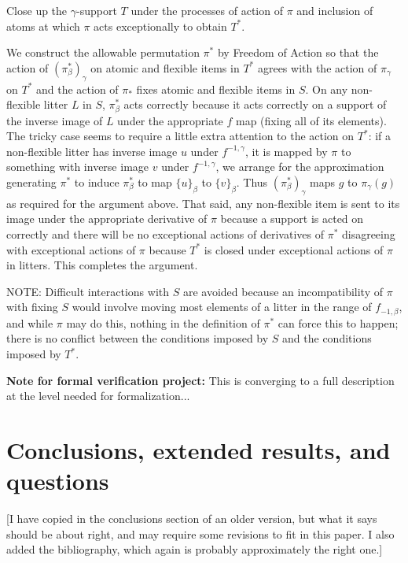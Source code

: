\documentclass[112pt]{article}
\begin{document}
Close up the $\gamma$-support $T$ under the processes of action of $\pi$ and inclusion of atoms at which $\pi$ acts exceptionally to obtain $T^*$.

We construct the allowable permutation $\pi^*$ by Freedom of Action so that the action of $(\pi^*_\beta)_\gamma$ on atomic and flexible items in $T^*$ agrees with the action of $\pi_\gamma$ on $T^*$
and the action of $\pi_*$ fixes atomic and flexible items in $S$.  On any non-flexible litter $L$ in $S$, $\pi^*_\beta$ acts correctly because it acts correctly on a support of the inverse image of $L$ under the appropriate $f$ map (fixing all of its elements).
The tricky case seems to require a little extra attention to the action on $T^*$:  if a non-flexible litter has inverse image $u$ under $f^{-1,\gamma}$, it is mapped by $\pi$ to something with inverse image $v$ under $f^{-1,\gamma}$, we arrange for the
approximation generating $\pi^*$ to induce
$\pi^*_\beta$ to map $\{u\}_\beta$ to $\{v\}_\beta$.  Thus  $(\pi^*_\beta)_\gamma$ maps $g$ to $\pi_\gamma(g)$ as required for the argument above.  That said, any non-flexible item is sent to its image under the appropriate derivative of $\pi$ because
a support is acted on correctly and there will be no exceptional actions of derivatives of $\pi^*$ disagreeing with exceptional actions of $\pi$ because $T^*$ is closed under exceptional actions of $\pi$ in litters.  This completes the argument.

NOTE:  Difficult interactions with $S$ are avoided because an incompatibility of $\pi$ with fixing $S$ would involve moving most elements of a litter in the range of $f_{-1,\beta}$, and while $\pi$ may do this, nothing in the definition
of $\pi^*$ can force this to happen;  there is no conflict between the conditions imposed by $S$ and the conditions imposed by $T^*$.














{\bf Note for formal verification project:}  This is converging to a full description at the level needed for formalization...

\newpage

\section{Conclusions, extended results, and questions}
[I have copied in the conclusions section of an older version, but what it says should be about right, 
and may require some revisions to fit in this paper.  I also added the bibliography, which again is probably approximately the right one.]
\end{document}
